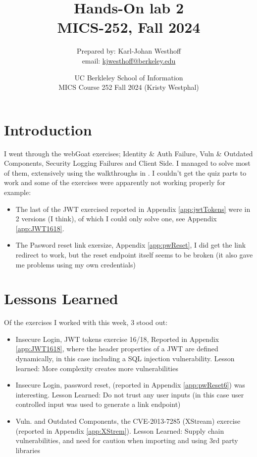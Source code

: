 \documentclass[
	letterpaper, %
	10pt, %
	unnumberedsections, %
	twoside, %
]{APAAssignment}
\title{Hands-On lab 2 \\ MICS-252, Fall 2024} %
\date{UC Berkleley School of Information \\
MICS Course 252 Fall 2024 (Kristy Westphal)
}
\author{
	Prepared by: Karl-Johan Westhoff \\
	email: \href{mailto:kjwesthoff@berkeley.edu}{kjwesthoff@berkeley.edu}
}
\begin{document}
\onecolumn
\maketitle %


\section{Introduction}
I went through the webGoat exercises; Identity \& Auth Failure, Vuln \& Outdated Components, Security Logging Failures and Client Side. I managed to solve most of them, extensively using the walkthroughs in \cite{CycubicsDocsWebGoat}.
I couldn't get the quiz parts to work and some of the exercises were apparently not working properly for example: 
\begin{itemize}
	\item{The last of the JWT exercised reported in Appendix \ref{app:jwtTokens} were in 2 versions (I think), of which I could only solve one, see Appendix \ref{app:JWT1618}}.  
	\item{The Pasword reset link exersize, Appendix \ref{app:pwReset}, I did get the link redirect to work, but the reset endpoint itself seems to be broken (it also gave me problems using my own credentials)} 
\end{itemize}

\section{Lessons Learned}
Of the exercises I worked with this week, 3 stood out:
\begin{itemize}
	\item{Insecure Login, JWT tokens exercise 16/18, Reported in Appendix \ref{app:JWT1618}, where the header properties of a JWT are defined dynamically, in this case including a SQL injection vulnerability. Lesson learned: More complexity creates more vulnerabilities}
	\item{Insecure Login, password reset, (reported in Appendix \ref{app:pwReset6}) was interesting. Lesson Learned: Do not trust any user inputs (in this case user controlled input was used to generate a link endpoint)}
	\item{Vuln. and Outdated Components, the CVE-2013-7285 (XStream) exercise (reported in Appendix \ref{app:XStrem}). Lesson Learned: Supply chain vulnerabilities, and need for caution when importing and using 3rd party libraries}
\end{itemize}
\end{document}
